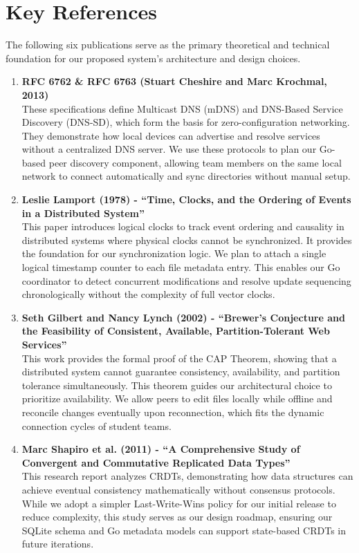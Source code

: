 \documentclass[11pt,oneside]{article}
\begin{document}
\section{Key References}

The following six publications serve as the primary theoretical and technical foundation for our proposed system's architecture and design choices.

\begin{enumerate}
    \item \textbf{RFC 6762 \& RFC 6763 (Stuart Cheshire and Marc Krochmal, 2013)} \cite{rfc6762, rfc6763} \\
    These specifications define Multicast DNS (mDNS) and DNS-Based Service Discovery (DNS-SD), which form the basis for zero-configuration networking. They demonstrate how local devices can advertise and resolve services without a centralized DNS server. We use these protocols to plan our Go-based peer discovery component, allowing team members on the same local network to connect automatically and sync directories without manual setup.

    \item \textbf{Leslie Lamport (1978) - ``Time, Clocks, and the Ordering of Events in a Distributed System''} \cite{lamport1978} \\
    This paper introduces logical clocks to track event ordering and causality in distributed systems where physical clocks cannot be synchronized. It provides the foundation for our synchronization logic. We plan to attach a single logical timestamp counter to each file metadata entry. This enables our Go coordinator to detect concurrent modifications and resolve update sequencing chronologically without the complexity of full vector clocks.

    \item \textbf{Seth Gilbert and Nancy Lynch (2002) - ``Brewer's Conjecture and the Feasibility of Consistent, Available, Partition-Tolerant Web Services''} \cite{brewer2002} \\
    This work provides the formal proof of the CAP Theorem, showing that a distributed system cannot guarantee consistency, availability, and partition tolerance simultaneously. This theorem guides our architectural choice to prioritize availability. We allow peers to edit files locally while offline and reconcile changes eventually upon reconnection, which fits the dynamic connection cycles of student teams.

    \item \textbf{Marc Shapiro et al. (2011) - ``A Comprehensive Study of Convergent and Commutative Replicated Data Types''} \cite{shapiro2011} \\
    This research report analyzes CRDTs, demonstrating how data structures can achieve eventual consistency mathematically without consensus protocols. While we adopt a simpler Last-Write-Wins policy for our initial release to reduce complexity, this study serves as our design roadmap, ensuring our SQLite schema and Go metadata models can support state-based CRDTs in future iterations.


\end{enumerate}
\end{document}
